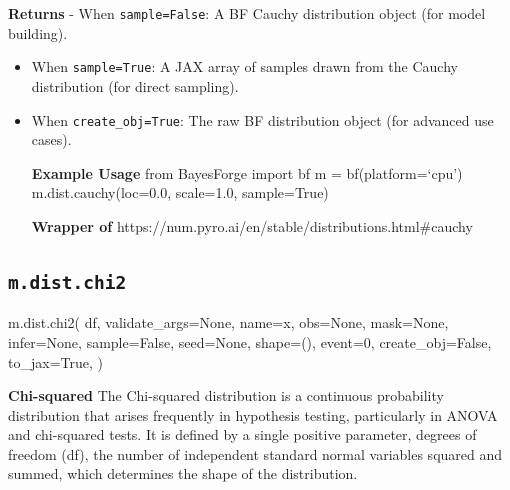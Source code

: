 \documentclass[
  letterpaper,
  DIV=11,
  numbers=noendperiod]{scrartcl}
\newenvironment{Shaded}{\begin{snugshade}}{\end{snugshade}}
\newcommand{\DecValTok}[1]{\textcolor[rgb]{0.68,0.00,0.00}{#1}}
\newcommand{\NormalTok}[1]{\textcolor[rgb]{0.00,0.23,0.31}{#1}}
\newcommand{\OperatorTok}[1]{\textcolor[rgb]{0.37,0.37,0.37}{#1}}
\newcommand{\StringTok}[1]{\textcolor[rgb]{0.13,0.47,0.30}{#1}}
\newcommand{\VariableTok}[1]{\textcolor[rgb]{0.07,0.07,0.07}{#1}}
\begin{document}
\textbf{Returns} - When \texttt{sample=False}: A BF Cauchy distribution
object (for model building).

\begin{itemize}
\item
  When \texttt{sample=True}: A JAX array of samples drawn from the
  Cauchy distribution (for direct sampling).
\item
  When \texttt{create\_obj=True}: The raw BF distribution object (for
  advanced use cases).

  \textbf{Example Usage} from BayesForge import bf m =
  bf(platform=`cpu') m.dist.cauchy(loc=0.0, scale=1.0, sample=True)

  \textbf{Wrapper of}
  https://num.pyro.ai/en/stable/distributions.html\#cauchy
\end{itemize}

\subsection{\texorpdfstring{\texttt{m.dist.chi2}}{m.dist.chi2}}\label{chi2}

\begin{Shaded}
\begin{Highlighting}[]
\NormalTok{m.dist.chi2(}
\NormalTok{    df,}
\NormalTok{    validate\_args}\OperatorTok{=}\VariableTok{None}\NormalTok{,}
\NormalTok{    name}\OperatorTok{=}\StringTok{\textquotesingle{}x\textquotesingle{}}\NormalTok{,}
\NormalTok{    obs}\OperatorTok{=}\VariableTok{None}\NormalTok{,}
\NormalTok{    mask}\OperatorTok{=}\VariableTok{None}\NormalTok{,}
\NormalTok{    infer}\OperatorTok{=}\VariableTok{None}\NormalTok{,}
\NormalTok{    sample}\OperatorTok{=}\VariableTok{False}\NormalTok{,}
\NormalTok{    seed}\OperatorTok{=}\VariableTok{None}\NormalTok{,}
\NormalTok{    shape}\OperatorTok{=}\NormalTok{(),}
\NormalTok{    event}\OperatorTok{=}\DecValTok{0}\NormalTok{,}
\NormalTok{    create\_obj}\OperatorTok{=}\VariableTok{False}\NormalTok{,}
\NormalTok{    to\_jax}\OperatorTok{=}\VariableTok{True}\NormalTok{,}
\NormalTok{)}
\end{Highlighting}
\end{Shaded}

\textbf{Chi-squared} The Chi-squared distribution is a continuous
probability distribution that arises frequently in hypothesis testing,
particularly in ANOVA and chi-squared tests. It is defined by a single
positive parameter, degrees of freedom (df), the number of independent
standard normal variables squared and summed, which determines the shape
of the distribution.
\end{document}
